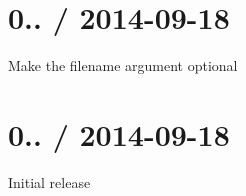 \section*{0.. / 2014-\/09-\/18 }


\begin{DoxyItemize}
\item Make the {\ttfamily filename} argument optional
\end{DoxyItemize}

\section*{0.. / 2014-\/09-\/18 }


\begin{DoxyItemize}
\item Initial release 
\end{DoxyItemize}